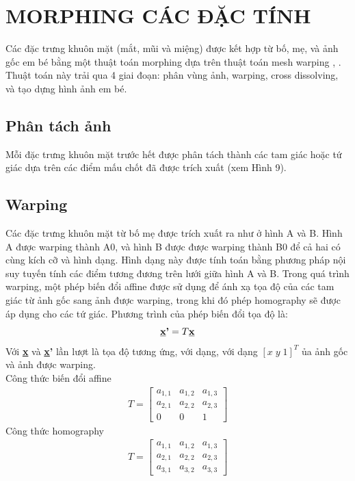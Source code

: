 \documentclass[conference]{IEEEtran}
\begin{document}
\section{MORPHING CÁC ĐẶC TÍNH}
Các đặc trưng khuôn mặt (mắt, mũi và miệng) được kết hợp từ bố, mẹ, và ảnh gốc em bé bằng một thuật toán morphing dựa trên thuật toán mesh warping \cite{ref:r10}, \cite{ref:r11}. Thuật toán này trải qua 4 giai đoạn: phân vùng ảnh, warping, cross dissolving, và tạo dựng hình ảnh em bé.
\subsection{Phân tách ảnh}
Mỗi đặc trưng khuôn mặt trước hết được phân tách thành các tam giác hoặc tứ giác dựa trên các điểm mấu chốt đã được trích xuất (xem Hình 9).
\subsection{Warping}
Các đặc trưng khuôn mặt từ bố mẹ được trích xuất ra như ở hình A và B. Hình A được warping thành A0, và hình B được được warping thành B0 để cả hai có cùng kích cỡ và hình dạng. Hình dạng này được tính toán bằng phương pháp nội suy tuyến tính các điểm tương đương trên lưới giữa hình A và B. Trong quá trình warping, một phép biến đổi affine được sử dụng để ánh xạ tọa độ của các tam giác từ ảnh gốc sang ảnh được warping, trong khi đó phép homography sẽ được áp dụng cho các tứ giác. Phương trình của phép biến đổi tọa độ là:\[\textbf{\underline{x}'} = T\textbf{\underline{x}}\] 
Với \textbf{\underline{x}} và \textbf{\underline{x}'} lần lượt là tọa độ tương ứng, với dạng, với dạng $[x\; y\; 1]^T$  ủa ảnh gốc và ảnh được warping.
\\
Công thức biến đổi affine
\begin{align*}
	T =
    \begin{bmatrix}
        a_{1,1} & a_{1,2} & a_{1,3} \\
        a_{2,1} & a_{2,2} & a_{2,3} \\
        0 & 0 & 1
    \end{bmatrix}
\end{align*}
Công thức homography
\begin{align*}
	T =
    \begin{bmatrix}
        a_{1,1} & a_{1,2} & a_{1,3} \\
        a_{2,1} & a_{2,2} & a_{2,3} \\
        a_{3,1} & a_{3,2} & a_{3,3}
    \end{bmatrix}
\end{align*}
\end{document}

